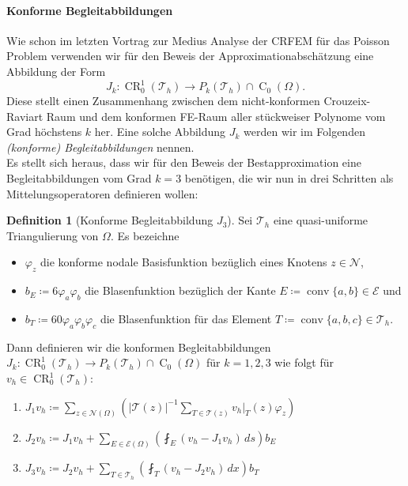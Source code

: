 \message{ !name(script.tex)}\documentclass[a4paper]{scrartcl}
\newcommand{\crfem}{\operatorname{CR}_0^1}
\newcommand{\czero}{\operatorname{C}_0}
\newcommand{\mesh}{\mathcal{T}_h}
\newcommand{\edges}{\mathcal{E}}
\newcommand{\nodes}{\mathcal{N}}
\newcommand{\dx}{\,dx}
\DeclareMathOperator{\conv}{conv}
\theoremstyle{plain}
\theoremstyle{definition}
\newtheorem{definition}{Definition}
\theoremstyle{remark}
\begin{document}
\paragraph{Konforme Begleitabbildungen}
\label{sec:konf-begl}

Wie schon im letzten Vortrag zur Medius Analyse der CRFEM für das
Poisson Problem verwenden wir für den Beweis der
Approximationabschätzung eine Abbildung der Form 
\[ J_k \colon \crfem(\mesh) \rightarrow
P_k(\mesh)\cap\czero(\Omega).\] 
Diese stellt einen Zusammenhang zwischen dem nicht-konformen
Crouzeix-Raviart Raum und dem konformen FE-Raum aller stückweiser
Polynome vom Grad höchstens \(k\) her. Eine
solche Abbildung \(J_k\) werden wir im Folgenden \emph{(konforme)
  Begleitabbildungen} nennen. \\ 
Es stellt sich heraus, dass wir für den Beweis der Bestapproximation
eine Begleitabbildungen vom Grad \(k=3\) benötigen, die wir nun in
drei Schritten als Mittelungsoperatoren definieren wollen: 

\begin{definition}[Konforme Begleitabbildung \(J_3\)]\label{def:3}
  Sei \(\mesh\) eine quasi-uniforme Triangulierung von \(\Omega\). Es
  bezeichne 
  \begin{itemize}
  \item \(\varphi_z\) die konforme nodale Basisfunktion bezüglich
    eines Knotens \(z\in\mathcal{N}\),
  \item \(b_E \coloneqq 6\varphi_a\varphi_b\) die Blasenfunktion
    bezüglich der Kante \(E \coloneqq 
    \conv\{a,b\} \in \edges\) und
  \item \(b_T \coloneqq 60\varphi_a\varphi_b\varphi_c\) die
    Blasenfunktion für das Element \(T \coloneqq \conv\{a,b,c\} \in
    \mesh\).
  \end{itemize}
  Dann definieren wir die konformen Begleitabbildungen \(J_k \colon
  \crfem(\mesh) \rightarrow P_k(\mesh)\cap\czero(\Omega)\) für
  \(k=1,2,3\) wie folgt für \(v_h \in \crfem(\mesh)\): 
  \begin{enumerate}[label=\textit{(\roman*)}]
  \item \(J_1 v_h \coloneqq \sum_{z \in
      \nodes(\Omega)}\left(\left\lvert \mathcal{T}(z)\right\rvert^{-1}
      \sum_{T\in \mathcal{T}(z)} v_h\vert_T(z) \varphi_z \right)\)
  \item \(J_2 v_h \coloneqq J_1 v_h + \sum_{E\in\edges(\Omega)} 
    \left(\fint_E (v_h - J_1 v_h) \,ds\right)b_E\)
  \item \(J_3 v_h \coloneqq J_2 v_h + \sum_{T\in\mesh}\left(\fint_T(v_h
      - J_2 v_h)\dx \right)b_T\)
  \end{enumerate}
\end{definition}
\end{document}
